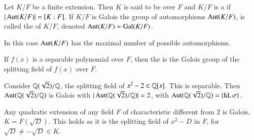 \documentclass[12pt, a4paper, oneside, openright, titlepage]{book}
\begin{document}
\begin{defn}
    Let $K/F$ be a finite extension. Then $K$ is said to be  over $F$ and $K/F$ is a  if $|\operatorname{Aut}(K/F)| = [K:F]$. If $K/F$ is Galois the group of automorphisms $\operatorname{Aut}(K/F)$, is called the  of $K/F$, denoted $\operatorname{Aut}(K/F) = \text{Gal}(K/F)$. 
\end{defn}

In this case $\operatorname{Aut}(K/F)$ has the maximal number of possible automorphisms. 


\begin{defn}
    If $f(x)$ is a separable polynomial over $F$, then the  is the Galois group of the splitting field of $f(x)$ over $F$.
\end{defn}


\begin{eg}
    Consider $\mathbb Q(\sqrt{2})/\mathbb Q$, the splitting field of $x^2 - 2 \in \mathbb Q[x]$. This is separable. Then $\operatorname{Aut}(\mathbb Q(\sqrt{2})/\mathbb Q)$ is Galois with $|\operatorname{Aut}(\mathbb Q(\sqrt{2})/\mathbb Q)| = 2$, with $\operatorname{Aut}(\mathbb Q(\sqrt{2})/\mathbb Q) = \{\operatorname{Id}, \sigma\}$.
\end{eg}

\begin{eg}
    Any quadratic extension of any field $F$ of characteristic different from $2$ is Galois, $K = F(\sqrt{D})$. This holds as it is the splitting field of $x^2-D$ in $F$, for $\sqrt{D}\neq-\sqrt{D} \in K$.
\end{eg}
\end{document}
